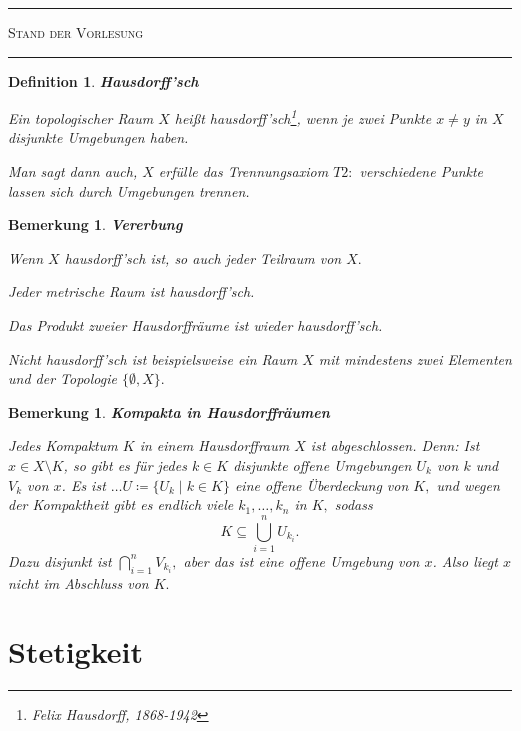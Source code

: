 \documentclass[12pt]{scrbook}   %
\newtheorem{bemX}[alles]{Bemerkung}
\newenvironment{bem}[1]{\begin{bemX}{\bf #1}\par\rm}{\end{bemX}}
\newtheorem{definiX}[alles]{Definition}
\newenvironment{defini}[1]{\begin{definiX}{\bf #1}\par\rm}{\end{definiX}}
\newcommand{\da}{\coloneqq}
\begin{document}
\hrule\textsc{Stand der Vorlesung}\hrule


\begin{defini}{Hausdorff'sch}
Ein topologischer Raum $X$ heißt 
{\it hausdorff'sch}\footnote{Felix Hausdorff, 1868-1942}, wenn je zwei
Punkte $x\neq y$ in $X$ disjunkte Umgebungen haben.

Man sagt dann auch, $X$ erfülle das Trennungsaxiom $T2:$ verschiedene Punkte
lassen sich durch Umgebungen trennen.

\end{defini}
 
\begin{bem}{Vererbung}
Wenn $X$ hausdorff'sch ist, so auch jeder Teilraum von $X.$

Jeder metrische Raum ist hausdorff'sch.

Das Produkt zweier Hausdorffräume ist wieder hausdorff'sch.

Nicht hausdorff'sch ist beispielsweise ein Raum $X$ mit mindestens zwei 
Elementen und der Topologie $\{\emptyset, X\}.$
\end{bem}

\begin{bem}{Kompakta in Hausdorffräumen}
\label{fuer Liouville}
Jedes Kompaktum $K$ in einem Hausdorffraum $X$ ist abgeschlossen. Denn:
Ist $x\in X\setminus K$, so gibt es für jedes $k\in K$ disjunkte
offene Umgebungen $U_k$ von $k$ und $V_k$ von $x$. Es ist $\dots U \da \{ U_k\mid k\in K\}$ eine offene Überdeckung von $K,$ und wegen der Kompaktheit 
gibt es endlich viele $k_1,\dots ,k_n$ in $K,$ sodass 
$$K \subseteq \bigcup_{i=1}^n U_{k_i}.$$
Dazu disjunkt ist $\bigcap_{i=1}^n V_{k_i},$ aber das ist eine offene Umgebung
von $x$. Also liegt $x$ nicht im Abschluss von $K.$
\end{bem}


\section{Stetigkeit}
\end{document}
